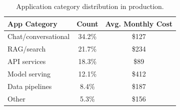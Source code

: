\begin{table}[H]
\centering
\small
\begin{tabular}{lcc}
\toprule
\textbf{App Category} & \textbf{Count} & \textbf{Avg. Monthly Cost} \\
\midrule
Chat/conversational & 34.2\% & \$127 \\
RAG/search & 21.7\% & \$234 \\
API services & 18.3\% & \$89 \\
Model serving & 12.1\% & \$412 \\
Data pipelines & 8.4\% & \$187 \\
Other & 5.3\% & \$156 \\
\bottomrule
\end{tabular}
\caption{Application category distribution in production.}
\label{tab:app_dist}
\end{table}

